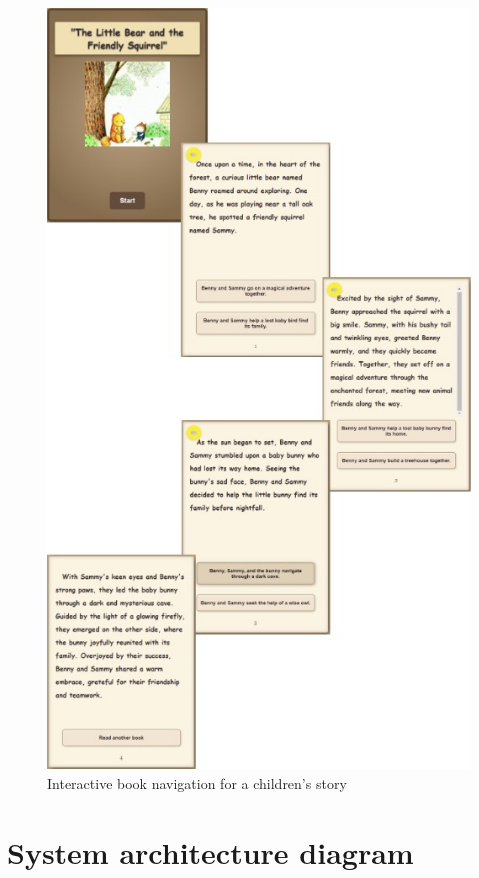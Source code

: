 \documentclass[conference]{IEEEtran}
\begin{document}
	\begin{figure}[H]
		\centering
		\includegraphics[width=0.7\linewidth]{img/img-ari3333-project-report-story-children}
		\caption{Interactive book navigation for a children's story}
		\label{fig:img-ari3333-project-report-story-children}
	\end{figure}

	
\pagebreak	
\section{System architecture diagram}
\label{appendix:system-architecture}
\end{document}
